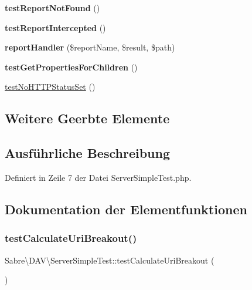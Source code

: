 \begin{DoxyCompactItemize}
{\bfseries test\+Report\+Not\+Found} ()
\item 
\mbox{\label{class_sabre_1_1_d_a_v_1_1_server_simple_test_a35fbaf15b5b5b56bdcd4b836f5a65919}} 
{\bfseries test\+Report\+Intercepted} ()
\item 
\mbox{\label{class_sabre_1_1_d_a_v_1_1_server_simple_test_a510a81accb0d9bda3540d656902b913a}} 
{\bfseries report\+Handler} (\$report\+Name, \$result, \$path)
\item 
\mbox{\label{class_sabre_1_1_d_a_v_1_1_server_simple_test_a2c1a3858fbb7ec0562ec5f2034e91fc2}} 
{\bfseries test\+Get\+Properties\+For\+Children} ()
\item 
\mbox{\hyperlink{class_sabre_1_1_d_a_v_1_1_server_simple_test_ad61954ab12b196097e841182a74ef78d}{test\+No\+H\+T\+T\+P\+Status\+Set}} ()
\end{DoxyCompactItemize}
\subsection*{Weitere Geerbte Elemente}


\subsection{Ausführliche Beschreibung}


Definiert in Zeile 7 der Datei Server\+Simple\+Test.\+php.



\subsection{Dokumentation der Elementfunktionen}
\mbox{\label{class_sabre_1_1_d_a_v_1_1_server_simple_test_a83edfb0f3a800ecc6bf32e2518604a0c}} 
\subsubsection{\texorpdfstring{test\+Calculate\+Uri\+Breakout()}{testCalculateUriBreakout()}}
{\footnotesize\ttfamily Sabre\textbackslash{}\+D\+A\+V\textbackslash{}\+Server\+Simple\+Test\+::test\+Calculate\+Uri\+Breakout (\begin{DoxyParamCaption}{ }\end{DoxyParamCaption})}



